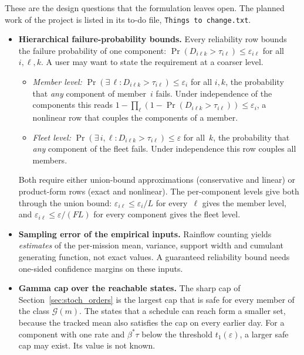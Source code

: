 \documentclass[11pt,a4paper]{article}
\theoremstyle{plain}
\theoremstyle{definition}
\theoremstyle{remark}
\begin{document}
These are the design questions that the formulation leaves open.
The planned work of the project is listed in its to-do file, \texttt{Things to change.txt}.
\begin{itemize}
  \item \textbf{Hierarchical failure-probability bounds.}
    Every reliability row bounds the failure probability of one component: $\Pr(D_{i\ell k} > \tau_{i\ell}) \le \varepsilon_{i\ell}$ for all $i, \ell, k$.
    A user may want to state the requirement at a coarser level.
    \begin{itemize}[nosep]
      \item \emph{Member level:} $\Pr(\exists\,\ell : D_{i\ell k} > \tau_{i\ell}) \le \varepsilon_i$ for all $i, k$, the probability that \emph{any} component of member~$i$ fails.
        Under independence of the components this reads $1 - \prod_\ell (1 - \Pr(D_{i\ell k} > \tau_{i\ell})) \le \varepsilon_i$, a nonlinear row that couples the components of a member.
      \item \emph{Fleet level:} $\Pr(\exists\,i,\ell : D_{i\ell k} > \tau_{i\ell}) \le \varepsilon$ for all~$k$, the probability that \emph{any} component of the fleet fails.
        Under independence this row couples all members.
    \end{itemize}
    Both require either union-bound approximations (conservative and linear) or product-form rows (exact and nonlinear).
    The per-component levels give both through the union bound: $\varepsilon_{i\ell} \le \varepsilon_i/L$ for every~$\ell$ gives the member level, and $\varepsilon_{i\ell} \le \varepsilon/(FL)$ for every component gives the fleet level.
  \item \textbf{Sampling error of the empirical inputs.}
    Rainflow counting yields \emph{estimates} of the per-mission mean, variance, support width and cumulant generating function, not exact values.
    A guaranteed reliability bound needs one-sided confidence margins on these inputs.
  \item \textbf{Gamma cap over the reachable states.}
    The sharp cap of Section~\ref{sec:stoch_orders} is the largest cap that is safe for every member of the class $\mathcal{G}(m)$.
    The states that a schedule can reach form a smaller set, because the tracked mean also satisfies the cap on every earlier day.
    For a component with one rate and $\beta^*\tau$ below the threshold $t_1(\varepsilon)$, a larger safe cap may exist.
    Its value is not known.
\end{itemize}



\end{document}
